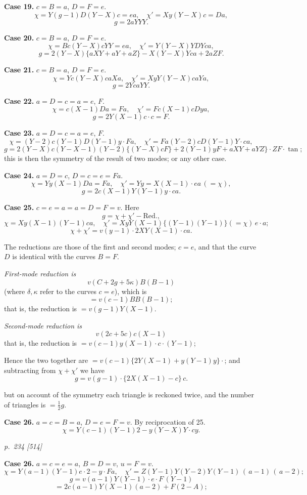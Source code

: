 \documentclass[11pt,a4paper]{book}
\begin{document}
\textbf{Case 19.}  $c=B=a$, $D=F=e$.
\[
\chi=Y(g-1)D(Y-X)c=ea, \quad \chi'=Xy(Y-X)c=Da,
\]
\[
g=2aYYY.
\]

\textbf{Case 20.}  $c=B=a$, $D=F=e$.
\[
\chi=Bc(Y-X)cYY=ea, \quad \chi'=Y(Y-X)YDYca,
\]
\[
g=2(Y-X)\{aXY+aY+aZ\}-X(Y-X)Yca+2aZF.
\]

\textbf{Case 21.}  $c=B=a$, $D=F=e$.
\[
\chi=Yc(Y-X)caXa, \quad \chi'=XyY(Y-X)caYa,
\]
\[
g=2YcaYY.
\]

\textbf{Case 22.}  $a=D=c=a=e$, $F$.
\[
\chi=c(X-1)Da=Fa, \quad \chi'=Fc(X-1)cDya,
\]
\[
g=2Y(X-1)c\cdot c=F.
\]

\textbf{Case 23.}  $a=D=c=a=e$, $F$.
\[
\chi=(Y-2)c(Y-1)D(Y-1)y\cdot Fa, \quad \chi'=Fa(Y-2)cD(Y-1)Y\cdot ca,
\]
\[
g=2(Y-X)c(Y-X-1)(Y-2)\{(Y-X)cF\}+2(Y-1)yF+aXY+aYZ\}\cdot ZF\cdot \tan;
\]
this is then the symmetry of the result of two modes; or any other case.

\textbf{Case 24.}  $a=D=c$, $D=c=e=Fa$.
\[
\chi=Yy(X-1)Da=Fa, \quad \chi'=Yy=X(X-1)\cdot ea\,(=\chi),
\]
\[
g=2c(X-1)Y(Y-1)y\cdot ca.
\]

\textbf{Case 25.}  $c=e=a=a=D=F=v$.  Here
\[
g=\chi+\chi'-\text{Red.},
\]
\[
\chi=Xy(X-1)(Y-1)ca, \quad \chi'=XyY(X-1)\{(Y-1)(Y-1)\}(=\chi)\,e\cdot a;
\]
\[
\chi+\chi'=v(y-1)\cdot 2XY(X-1)\cdot ca.
\]

The reductions are those of the first and second modes; $c=e$, and that the curve $D$
is identical with the curves $B=F$.

\textit{First-mode reduction is}
\[
v(C+2g+5\kappa)B(B-1)
\]
(where $\delta, \kappa$ refer to the curves $c=e$), which is
\[
=v(c-1)BB(B-1);
\]
that is, the reduction is $=v(g-1)Y(X-1)$.

\textit{Second-mode reduction is}
\[
v(2c+5c)c(X-1)
\]
that is, the reduction is $=v(c-1)y(X-1)\cdot c\cdot (Y-1)$;

Hence the two together are $=v(c-1)\{2Y(X-1)+y(Y-1)y\}\cdot$; and subtracting from
$\chi+\chi'$ we have
\[
g=v(g-1)\cdot \{2X(X-1)-c\}\,c.
\]

but on account of the symmetry each triangle is reckoned twice, and the number of
triangles is $=\frac{1}{2}g$.

\textbf{Case 26.}  $a=c=B=a$, $D=e=F=v$.  By reciprocation of 25.
\[
\chi=Y(c-1)(Y-1)2-y(Y-X)Y\cdot cy.
\]

\clearpage

\bigskip
\textit{p.~234 [514]}
\smallskip

\textbf{Case 26.}  $a=c=e=a$, $B=D=v$, $u=F=v$.
\[
\chi=Y(a-1)(Y-1)e\cdot 2-y\cdot Fa, \quad \chi'=Z(Y-1)Y(Y-2)Y(Y-1)\,(\,a-1)\,(\,a-2);
\]
\[
g=v(a-1)Y(Y-1)\cdot e\cdot F\,(Y-1)
\]
\[
=2c(a-1)Y(X-1)(a-2)+F(2-A);
\]
\end{document}
